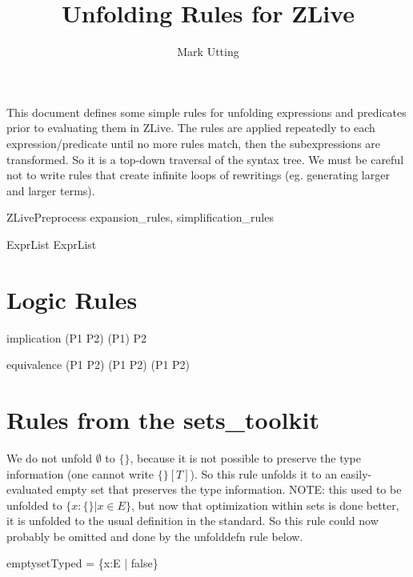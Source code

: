\documentclass{article}
\title{Unfolding Rules for ZLive}
\author{Mark Utting}
\begin{document}
\maketitle


This document defines some simple rules for unfolding expressions 
and predicates prior to evaluating them in ZLive.  The rules are
applied repeatedly to each expression/predicate until no more rules
match, then the subexpressions are transformed.  So it is a top-down
traversal of the syntax tree.  We must be careful not to write rules
that create infinite loops of rewritings (eg. generating larger and
larger terms).

\begin{zsection}
  \SECTION ZLivePreprocess \parents expansion\_rules, simplification\_rules
\end{zsection}

\begin{zedjoker}{ExprList} ExprList \end{zedjoker}

\section{Logic Rules}

\begin{zedrule}{implication}
   (P1 \implies P2) \iff (\lnot P1) \lor P2
\end{zedrule}

\begin{zedrule}{equivalence}
   (P1 \iff P2) \iff (P1 \land P2) \lor (\lnot P1 \land \lnot P2)
\end{zedrule}


\section{Rules from the sets\_toolkit}

We do not unfold $\emptyset$ to $\{\}$, because it is not possible
to preserve the type information (one cannot write $\{\}[T]$).
So this rule unfolds it to an easily-evaluated empty set that
preserves the type information.  
NOTE: this used to be unfolded to $\{x:\{\} | x \in E\}$, but
now that optimization within sets is done better, it is unfolded
to the usual definition in the standard.  So this rule could now
probably be omitted and done by the unfolddefn rule below.
\begin{zedrule}{emptysetTyped}
   \emptyset[E] = \{x:E | false\}  
\end{zedrule}
\end{document}
